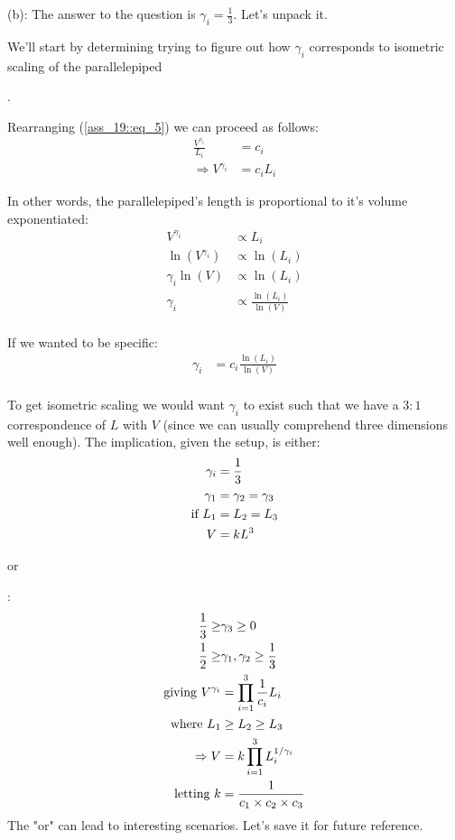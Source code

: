 \begin{enumerate}
(b): The answer to the question is $\gamma_i = \frac{1}{3}$. Let's unpack it.

\hypertarget{isometric}{We'll start by determining trying to figure out how $\gamma_i$ corresponds to isometric scaling of the parallelepiped}.

Rearranging (\ref{ass_19::eq_5}) we can proceed as follows:
\begin{align*}
   \frac{V^{\gamma_i}}{L_i} &= c_i\\
   \Rightarrow V^{\gamma_i} &= c_i L_i
\end{align*}

In other words, the parallelepiped's length is proportional to it's volume exponentiated:
\begin{align*}
   V^{\gamma_i} &\propto L_i\\
   \ln{(V^{\gamma_i})} &\propto
             \ln{(L_i)}\\
   \gamma_i \ln{(V)} &\propto
             \ln{(L_i)}\\
   \gamma_i &\propto
             \frac{\ln{(L_i)}}
             {\ln{(V)}}\\
\end{align*}

If we wanted to be specific:
\begin{align*}
   \gamma_i &= c_i
             \frac{\ln{(L_i)}}
             {\ln{(V)}} \label{ass_19::q_1_b}\\
\end{align*}

To get isometric scaling we would want $\gamma_i$ to exist such that we have a $3:1$ correspondence of $L$ with $V$ (since we can usually comprehend three dimensions well enough). The implication, given the setup, is either:
\begin{align*}
   \gamma_i &= \frac{1}{3}\\
   \gamma_1 &= \gamma_2 = \gamma_3\\
   \textnormal{if }
        L_1 &= L_2 = L_3\\
          V &= k {L^{3}}
\end{align*}

\hypertarget{allometric}{or}:
\begin{align*}
   \frac{1}{3} \geq &\gamma_3 \geq 0\\
   \frac{1}{2} \geq &\gamma_1, \gamma_2 \geq \frac{1}{3}\\
   \textnormal{giving }
          V^{\gamma_i} &= \prod_{i=1}^{3} \frac{1}{c_i} L_i\\
   \textnormal{where }
        L_1 &\geq L_2 \geq L_3\\
        \Rightarrow
        V &= k \prod_{i=1}^{3} {L_{i}^{1/\gamma_i}}\\
   \textnormal{letting } 
          k &= \frac{1}{c_1 \times c_2 \times c_3}
    \label{allometric}
\end{align*}
The "or" can lead to interesting scenarios.
Let's save it for future reference.


\end{enumerate}
